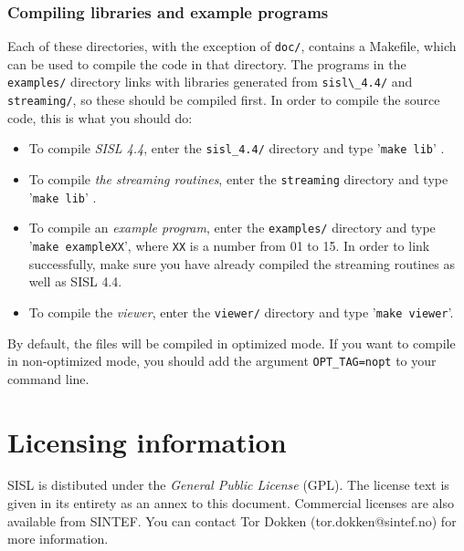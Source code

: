 \subsubsection{Compiling libraries and example programs}
Each of these directories, with the exception of \verb-doc/-, contains a Makefile, which
can be used to compile the code in that directory.  The programs in the \verb-examples/-
directory links with libraries generated from \verb-sisl\_4.4/- and \verb-streaming/-, so
these should be compiled first.
In order to compile the source code, this is what you should do:
\begin{itemize}
\item To compile \emph{SISL 4.4}, enter the \verb-sisl_4.4/- directory and type
      '\verb-make lib-' .
\item To compile \emph{the streaming routines}, enter the \verb-streaming- directory and type
      '\verb-make lib-' .
\item To compile an \emph{example program}, enter the \verb-examples/- directory and type
      '\verb-make exampleXX-', where \verb-XX- is a number from 01 to 15.  In order to 
      link successfully, make sure you have already compiled the streaming routines as well
      as SISL 4.4.
\item To compile the \emph{viewer}, enter the \verb-viewer/- directory and type 
      '\verb-make viewer-'.
\end{itemize}
By default, the files will be compiled in optimized mode.  If you want to compile in 
non-optimized mode, you should add the argument \verb-OPT_TAG=nopt- to your command line.

\section{Licensing information}
SISL is distibuted under the \emph{General Public License} (GPL).  The license text 
is given in its entirety as an annex to this document.  Commercial licenses are also
available from SINTEF.  You can contact Tor Dokken (tor.dokken@sintef.no) for more
information.

